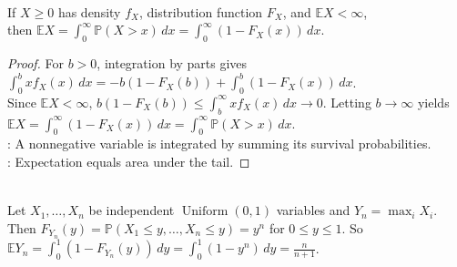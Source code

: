 \begin{proposition} \label{prop:tail-integral-formula-nonnegative} \\
If $X\geq0$ has density $f_X$, distribution function $F_X$, and $\mathbb{E}X<\infty$,\\
then $\mathbb{E}X=\int_0^\infty\mathbb{P}(X>x)\,dx=\int_0^\infty(1-F_X(x))\,dx$.
\begin{proof}
For $b>0$, integration by parts gives $\int_0^bxf_X(x)\,dx=-b(1-F_X(b))+\int_0^b(1-F_X(x))\,dx$.\\
Since $\mathbb{E}X<\infty$, $b(1-F_X(b))\leq\int_b^\infty xf_X(x)\,dx\to0$. Letting $b\to\infty$ yields $\mathbb{E}X=\int_0^\infty(1-F_X(x))\,dx=\int_0^\infty\mathbb{P}(X>x)\,dx$.\\
: A nonnegative variable is integrated by summing its survival probabilities.\\
: Expectation equals area under the tail.
\end{proof}
\end{proposition}

\begin{example} \label{ex:maximum-uniform-expectation} \\
Let $X_1,\ldots,X_n$ be independent $\operatorname{Uniform}(0,1)$ variables and $Y_n=\max_iX_i$.\\
Then $F_{Y_n}(y)=\mathbb{P}(X_1\leq y,\ldots,X_n\leq y)=y^n$ for $0\leq y\leq1$. So $\mathbb{E}Y_n=\int_0^1(1-F_{Y_n}(y))\,dy=\int_0^1(1-y^n)\,dy=\frac{n}{n+1}$.
\end{example}


